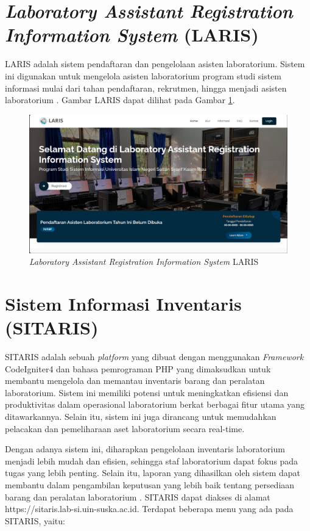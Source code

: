 \section{\textit{Laboratory Assistant Registration Information System} (LARIS)}
LARIS adalah sistem pendaftaran dan pengelolaan asisten laboratorium. Sistem ini digunakan untuk mengelola asisten laboratorium program studi sistem informasi mulai dari tahan pendaftaran, rekrutmen, hingga menjadi asisten laboratorium \cite{web-prodi}. Gambar LARIS dapat dilihat pada Gambar \ref{fig:laris}.

\begin{figure}[h]
	\centering
	\includegraphics[width=1\linewidth]{konten/gambar/laris.png}
	\caption{\textit{Laboratory Assistant Registration Information System} LARIS}
	\label{fig:laris}
\end{figure}


\section{Sistem Informasi Inventaris (SITARIS)}
SITARIS adalah sebuah \textit{platform} yang dibuat dengan menggunakan \textit{Framework} CodeIgniter4 dan bahasa pemrograman PHP yang dimaksudkan untuk membantu mengelola dan memantau inventaris barang dan peralatan laboratorium. Sistem ini memiliki potensi untuk meningkatkan efisiensi dan produktivitas dalam operasional laboratorium berkat berbagai fitur utama yang ditawarkannya. Selain itu, sistem ini juga dirancang untuk memudahkan pelacakan dan pemeliharaan aset laboratorium secara real-time.

Dengan adanya sistem ini, diharapkan pengelolaan inventaris laboratorium menjadi lebih mudah dan efisien, sehingga staf laboratorium dapat fokus pada tugas yang lebih penting. Selain itu, laporan yang dihasilkan oleh sistem dapat membantu dalam pengambilan keputusan yang lebih baik tentang persediaan barang dan peralatan laboratorium \cite{sitaris}. SITARIS dapat diakses di alamat https://sitaris.lab-si.uin-suska.ac.id. Terdapat beberapa menu yang ada pada SITARIS, yaitu:

